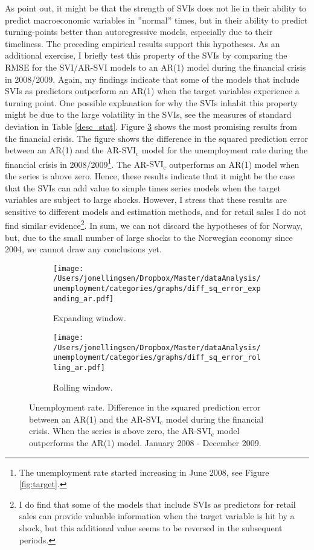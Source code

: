 As \textcite{choi2012} point out, it might be that the strength of SVIs does not lie in their ability to predict macroeconomic variables in ''normal'' times, but in their ability to predict turning-points better than autoregressive models, especially due to their timeliness. The preceding empirical results support this hypotheses. As an additional exercise, I briefly test this property of the SVIs by comparing the RMSE for the SVI/AR-SVI models to an AR(1) model during the financial crisis in 2008/2009. Again, my findings indicate that some of the models that include SVIs as predictors outperform an AR(1) when the target variables experience a turning point. One possible explanation for why the SVIs inhabit this property might be due to the large volatility in the SVIs, see the measures of standard deviation in Table \ref{desc_stat}. Figure \ref{fig:crisis} shows the most promising results from the financial crisis. The figure shows the difference in the squared prediction error between an AR(1) and the AR-$\text{SVI}_\text{c}$ model for the unemployment rate during the financial crisis in 2008/2009\footnote{The unemployment rate started increasing in June 2008, see Figure \ref{fig:target}.}. The AR-$\text{SVI}_\text{c}$ outperforms an AR(1) model when the series is above zero. Hence, these results indicate that it might be the case that the SVIs can add value to simple times series models when the target variables are subject to large shocks. However, I stress that these results are sensitive to different models and estimation methods, and for retail sales I do not find similar evidence\footnote{I do find that some of the models that include SVIs as predictors for retail sales can provide valuable information when the target variable is hit by a shock, but this additional value seems to be reversed in the subsequent periods.}. In sum, we can not discard the hypotheses of \textcite{choi2012} for Norway, but, due to the small number of large shocks to the Norwegian economy since 2004, we cannot draw any conclusions yet.
\vspace{1cm}
\begin{figure}[H]
    \centering
    \begin{subfigure}[b]{0.45\textwidth}
\caption{Expanding window.}
\label{diff_sq_error_expanding_ar_urate}
        \texttt{[image: /Users/jonellingsen/Dropbox/Master/dataAnalysis/unemployment/categories/graphs/diff\_sq\_error\_expanding\_ar.pdf]}
    \end{subfigure}
\begin{subfigure}[b]{0.45\textwidth}
 \caption{Rolling window.}
\label{diff_sq_error_rolling_ar_urate}       
\texttt{[image: /Users/jonellingsen/Dropbox/Master/dataAnalysis/unemployment/categories/graphs/diff\_sq\_error\_rolling\_ar.pdf]}
    \end{subfigure}\hfill
\caption{Unemployment rate. Difference in the squared prediction error between an AR(1) and the AR-$\text{SVI}_\text{c}$ model during the financial crisis. When the series is above zero, the AR-$\text{SVI}_\text{c}$ model outperforms the AR(1) model. January 2008 - December 2009.}
\label{fig:crisis}
\end{figure}